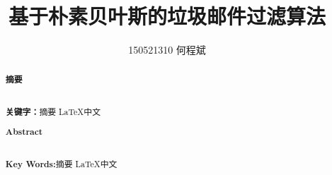 \documentclass[UTF8,zihao=-4]{ctexart}
\title{基于朴素贝叶斯的垃圾邮件过滤算法}
\author{150521310 何程斌}
\date{}
\begin{document}
\begin{titlepage}
  \maketitle
  \thispagestyle{empty}
\end{titlepage}

\begin{abstract}
  \begin{center}
    {\noindent{} \linespread{1.25}\songti{}\textbf{摘要}}
  \end{center}

  \linespread{1.25}\songti{}\zhlipsum*[1]\\

  \noindent\heiti{}\textbf{关键字：}摘要  \LaTeX  中文
\end{abstract}

\begin{abstract}
  \begin{center}
    {\noindent{} \linespread{1.25}\textbf{Abstract}}
  \end{center}

  \linespread{1.25} \lipsum*[1]\\

  \noindent{}\textbf{Key Words:}摘要  \LaTeX  中文
\end{abstract}
\newpage

\linespread{1.25}
\tableofcontents
\newpage
\end{document}
